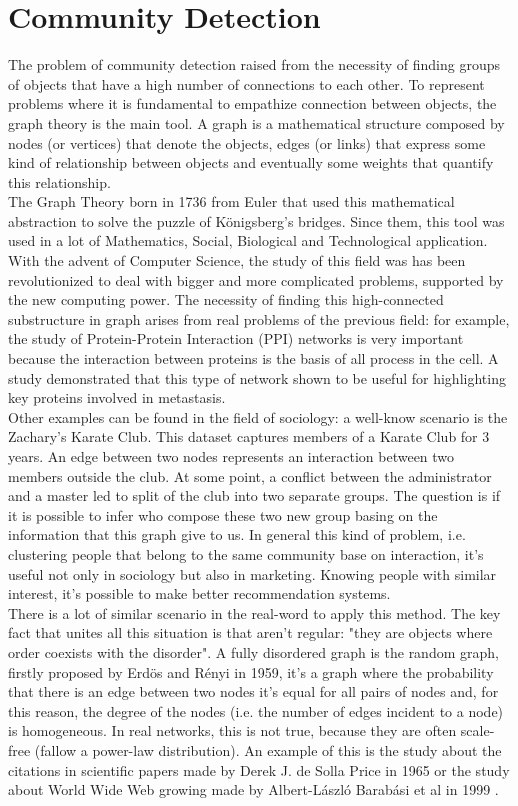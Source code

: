 \section{Community Detection}
The problem of community detection raised from the necessity of finding groups of objects that have a high number of connections to each other. To represent problems where it is fundamental to empathize connection between objects, the graph theory is the main tool. A graph is a mathematical structure composed by nodes (or vertices) that denote the objects, edges (or links) that express some kind of relationship between objects and eventually some weights that quantify this relationship.\\
The Graph Theory born in 1736 from Euler that used this mathematical abstraction to solve the puzzle of Königsberg’s bridges. Since them, this tool was used in a lot of Mathematics, Social, Biological and Technological application. With the advent of Computer Science, the study of this field was has been revolutionized to deal with bigger and more complicated problems, supported by the new computing power. 
The necessity of finding this high-connected substructure in graph arises from real problems of the previous field: for example, the study of Protein-Protein Interaction (PPI) networks is very important because the interaction between proteins is the basis of all process in the cell. A study demonstrated that this type of network shown to be useful for highlighting key proteins involved in metastasis. \cite{metastasis} \\
Other examples can be found in the field of sociology: a well-know scenario is the Zachary's Karate Club. This dataset captures members of a Karate Club for 3 years.\cite{Zac77} An edge between two nodes represents an interaction between two members outside the club. At some point, a conflict between the administrator and a master led to split of the club into two separate groups. The question is if it is possible to infer who compose these two new group basing on the information that this graph give to us. In general this kind of problem,  i.e. clustering people that belong to the same community base on interaction, it's useful not only in sociology but also in marketing. Knowing people with similar interest, it's possible to make better recommendation systems.\\
There is a lot of similar scenario in the real-word to apply this method. The key fact that unites all this situation is that aren't regular: "they are objects where order coexists with the disorder". \cite{fortunato}  A fully disordered graph is the random graph, firstly proposed by Erdös and Rényi \cite{random} in 1959, it's a graph where the probability that there is an edge between two nodes it's equal for all pairs of nodes and, for this reason, the degree of the nodes (i.e. the number of edges incident to a node) is homogeneous. In real networks, this is not true, because they are often scale-free (fallow a power-law distribution). An example of this is the study about the citations in scientific papers made by Derek J. de Solla Price in 1965 \cite{dsp} or the study about World Wide Web growing made by Albert-László Barabási et al in 1999 \cite{Barab}.
